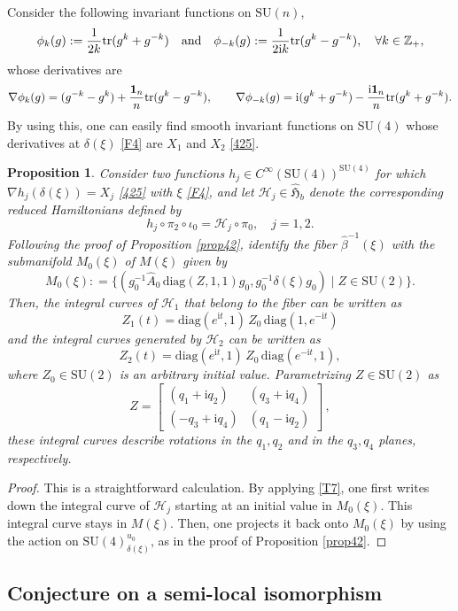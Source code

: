 \documentclass[a4paper,11pt,reqno]{amsart}
\newtheorem{prop}[thm]{Proposition}
\theoremstyle{definition}
\numberwithin{equation}{section}
\newcommand{\be}{\begin{equation}}
\newcommand{\ee}{\end{equation}}
\def\ri{{\mathrm{i}}}                       %
\def\1{{\mbox{\boldmath $1$}}}              %
\def\bZ{{\mathbb Z}}                        %
\def\tr{\mathrm{tr}}                        %
\def\diag{\mathrm{diag}}                    %
\def\SU{\mathrm{SU}}                        %
\def\fH{{\mathfrak{H}}}                     %
\def\cH{{\mathcal H}}                       %
\begin{document}
Consider the following invariant functions on $\SU(n)$,
\be
\phi_k(g):= \frac{1}{2k} \tr(g^k + g^{-k})
\quad\hbox{and}\quad
 \phi_{-k}(g):= \frac{1}{2\ri k} \tr(g^k - g^{-k}),
 \quad \forall k\in \bZ_+,
 \ee
 whose derivatives are
 \be
 \nabla \phi_k(g) = (g^{-k} - g^k) + \frac{\1_n}{n} \tr (g^k - g^{-k}),
 \qquad
\nabla \phi_{-k}(g) = \ri (g^{k} + g^{-k}) - \frac{\ri \1_n}{n} \tr (g^k + g^{-k}).
\ee
By using this, one can easily find smooth invariant functions on $\SU(4)$ whose
derivatives at $\delta(\xi)$ \eqref{F4}  are $X_1$ and $X_2$ \eqref{425}.

\begin{prop}\label{prop44}
Consider two functions $h_j \in C^\infty(\SU(4))^{\SU(4)}$ for which
$\nabla h_j(\delta(\xi)) = X_j$ \eqref{425} with $\xi$ \eqref{F4}, and let $\cH_j\in \hat \fH_b$
denote the corresponding reduced Hamiltonians defined by
\be
h_j \circ \pi_2 \circ \iota_0 = \cH_j \circ \pi_0, \quad j=1,2.
\ee
Following the proof of Proposition \ref{prop42},
identify the fiber $\hat \beta^{-1}(\xi)$ with the submanifold $M_0(\xi)$ of $M(\xi)$ given by
\be
M_0(\xi): = \{ (g_0^{-1} \hat A_0 \,\diag(Z,1,1) g_0, g_0^{-1} \delta(\xi) g_0) \mid Z\in \SU(2)\}.
\ee
Then,  the integral curves of $\cH_1$ that belong to the fiber can be written as
\be
Z_1(t) = \diag( e^{\ri t}, 1)\, Z_0\,
  \diag( 1, e^{-\ri t})
\label{Z1t}\ee
and the integral curves generated by $\cH_2$ can be written as
\be
Z_2(t) = \diag( e^{\ri t}, 1)\, Z_0\, \diag( e^{-\ri t}, 1),
\label{Z2t}\ee
where $Z_0 \in \SU(2)$ is an arbitrary initial value.
Parametrizing $Z \in \SU(2)$ as
\be
Z= \begin{bmatrix} (q_1 + \ri q_2) & (q_3 + \ri q_4) \\
(-q_3 + \ri q_4) & (q_1- \ri q_2)
\end{bmatrix}\,,
\ee
these integral curves describe rotations in the $q_1, q_2$ and in the $q_3, q_4$ planes, respectively.
\end{prop}
\begin{proof}
This is a straightforward calculation. By applying \eqref{T7}, one first writes down the integral curve of $\cH_j$ starting at an initial value
in $M_0(\xi)$. This integral curve stays in $M(\xi)$. Then, one projects it back onto $M_0(\xi)$ by using the
action on $\SU(4)_{\delta(\xi)}^{u_0}$, as in the proof of Proposition \ref{prop42}.
\end{proof}

\subsection{Conjecture on a semi-local isomorphism}\label{Sec44}
\end{document}
